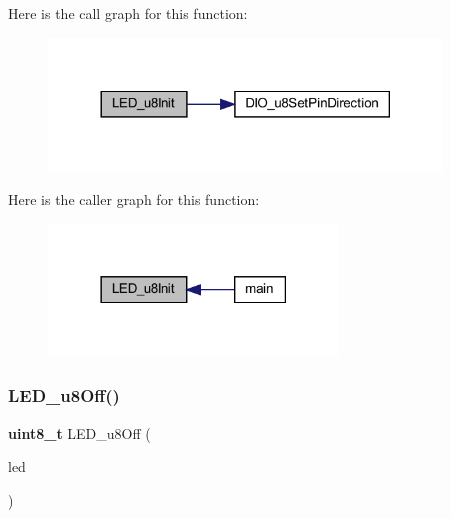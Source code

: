 Here is the call graph for this function\+:\nopagebreak
\begin{figure}[H]
\begin{center}
\leavevmode
\includegraphics[width=296pt]{_l_e_d_8h_a5ffbd3f57e696c662ae3ae52b119e867_cgraph}
\end{center}
\end{figure}
Here is the caller graph for this function\+:\nopagebreak
\begin{figure}[H]
\begin{center}
\leavevmode
\includegraphics[width=218pt]{_l_e_d_8h_a5ffbd3f57e696c662ae3ae52b119e867_icgraph}
\end{center}
\end{figure}
\mbox{\label{_l_e_d_8h_a9d5b876815db0f9fa1d1e2b3ecb4de64}} 
\subsubsection{L\+E\+D\+\_\+u8\+Off()}
{\footnotesize\ttfamily \textbf{ uint8\+\_\+t} L\+E\+D\+\_\+u8\+Off (\begin{DoxyParamCaption}\item[{\textbf{ L\+E\+D\+\_\+t}}]{led }\end{DoxyParamCaption})}

